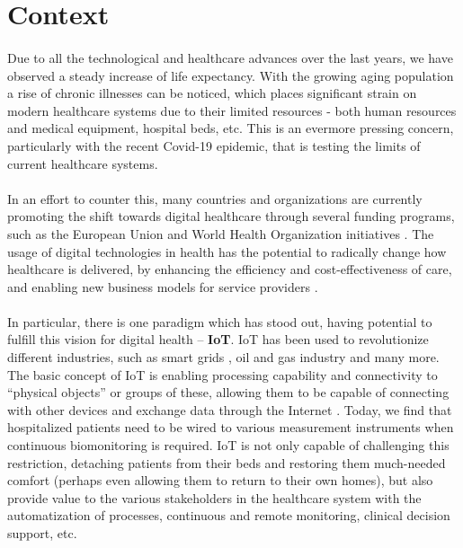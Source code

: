 

\section{Context}

\paragraph{} Due to all the technological and healthcare advances over the last years, we have observed a steady increase of life expectancy. With the growing aging population a rise of chronic illnesses can be noticed, which places significant strain on modern healthcare systems due to their limited resources - both human resources and medical equipment, hospital beds, etc\cite{Koen2019, Redondi2013}. This is an evermore pressing concern, particularly with the recent Covid-19 epidemic, that is testing the limits of current healthcare systems. 

\paragraph{} In an effort to counter this, many countries and organizations are currently promoting the shift towards digital healthcare through several funding programs, such as the European Union \cite{EuropeanUnion2021} and World Health Organization initiatives \cite{WorldHealthOrganization2020}. The usage of digital technologies in health has the potential to radically change how healthcare is delivered, by enhancing the efficiency and cost-effectiveness of care, and enabling new business models for service providers \cite{WorldHealthOrganization2020}.

\paragraph{} In particular, there is one paradigm which has stood out, having potential to fulfill this vision for digital health -- \textbf{\acf{IoT}}. \acs{IoT} has been used to revolutionize different industries, such as smart grids \cite{Faria2020}, oil and gas industry \cite{Shoja2018} and many more. The basic concept of \acs{IoT} is enabling processing capability and connectivity to ``physical objects'' or groups of these, allowing them to be capable of connecting with other devices and exchange data through the Internet \cite{gershenfeld2004internet}. Today, we find that hospitalized patients need to be wired to various measurement instruments when continuous biomonitoring is required. \acs{IoT} is not only capable of challenging this restriction, detaching patients from their beds and restoring them much-needed comfort (perhaps even allowing them to return to their own homes), but also provide value to the various stakeholders in the healthcare system with the automatization of processes, continuous and remote monitoring, clinical decision support, etc.

